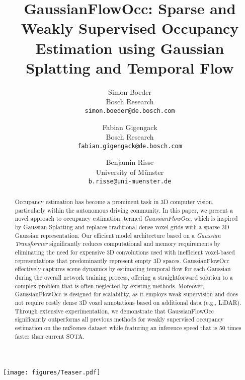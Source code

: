 \documentclass[10pt,twocolumn,letterpaper]{article}
\title{GaussianFlowOcc: Sparse and Weakly Supervised Occupancy Estimation using Gaussian Splatting and Temporal Flow}
\author{Simon Boeder\\
Bosch Research\\
{\tt\small simon.boeder@de.bosch.com}
\and
Fabian  Gigengack\\
Bosch Research\\
{\tt\small fabian.gigengack@de.bosch.com}
\and
Benjamin Risse\\
University of M\"unster\\
{\tt\small b.risse@uni-muenster.de}
}
\begin{document}
\maketitle

\begin{strip}
    \vspace{-11mm}
    \centering
    \texttt{[image: figures/Teaser.pdf]}
    \label{fig:teaser}
\end{strip}

\begin{abstract}
Occupancy estimation has become a prominent task in 3D computer vision, particularly within the autonomous driving community.
In this paper, we present a novel approach to occupancy estimation, termed \emph{GaussianFlowOcc}, which is inspired by Gaussian Splatting and replaces traditional dense voxel grids with a sparse 3D Gaussian representation.
Our efficient model architecture based on a \emph{Gaussian Transformer} significantly reduces computational and memory requirements by eliminating the need for expensive 3D convolutions used with inefficient voxel-based representations that predominantly represent empty 3D spaces.
GaussianFlowOcc effectively captures scene dynamics by estimating temporal flow for each Gaussian during the overall network training process, offering a straightforward solution to a complex problem that is often neglected by existing methods.
Moreover, GaussianFlowOcc is designed for scalability, as it employs weak supervision and does not require costly dense 3D voxel annotations based on additional data (e.g., LiDAR).
Through extensive experimentation, we demonstrate that GaussianFlowOcc significantly outperforms all previous methods for weakly supervised occupancy estimation on the nuScenes dataset while featuring an inference speed that is 50 times faster than current SOTA.
\end{abstract}

\vspace{-5mm}
\end{document}
